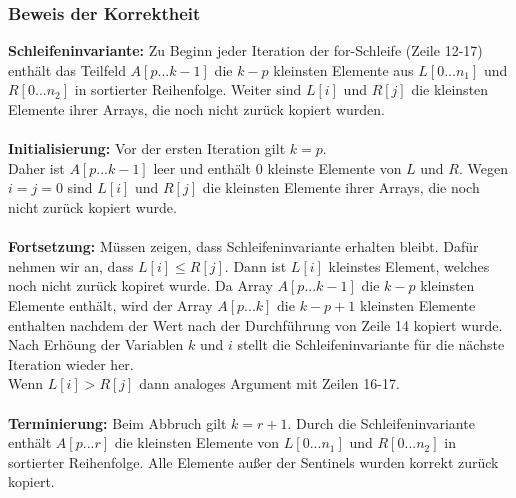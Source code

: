 		\subsubsection{Beweis der Korrektheit}
			\textbf{Schleifeninvariante:} Zu Beginn jeder Iteration der for-Schleife (Zeile 12-17) enthält 
			das Teilfeld $A[p...k-1]$ die $k-p$ kleinsten Elemente aus $L[0...n_1]$ und $R[0...n_2]$ 
			in sortierter Reihenfolge. Weiter sind $L[i]$ und $R[j]$ die kleinsten Elemente ihrer 
			Arrays, die noch nicht zurück kopiert wurden. \\ \\
			\textbf{Initialisierung:} Vor der ersten Iteration gilt $k = p$. \\ Daher ist $A[p...k-1]$
			leer und enthält $0$ kleinste Elemente von $L$ und $R$. Wegen $i = j = 0$ sind $L[i]$ und
			$R[j]$ die kleinsten Elemente ihrer Arrays, die noch nicht zurück kopiert wurde. \\ \\
			\textbf{Fortsetzung:} Müssen zeigen, dass Schleifeninvariante erhalten bleibt. Dafür nehmen wir an,
			dass $L[i] \leq R[j]$. Dann ist $L[i]$ kleinstes Element, welches noch nicht zurück kopiret wurde.
			Da Array $A[p...k-1]$ die $k - p$ kleinsten Elemente enthält, wird der Array $A[p...k]$ die 
			$k - p + 1$ kleinsten Elemente enthalten nachdem der Wert nach der Durchführung von Zeile 14 
			kopiert wurde. Nach Erhöung der Variablen $k$ und $i$ stellt die Schleifeninvariante für die 
			nächste Iteration wieder her. \\ Wenn $L[i] > R[j]$ dann analoges Argument mit Zeilen 16-17. \\ \\
			\textbf{Terminierung:} Beim Abbruch gilt $k = r + 1$. Durch die Schleifeninvariante enthält 
			$A[p...r]$ die kleinsten Elemente von $L[0...n_1]$ und $R[0...n_2]$ in sortierter Reihenfolge.
			Alle Elemente au\ss er der Sentinels wurden korrekt zurück kopiert.
			\vspace{1.5cm}
		
		
